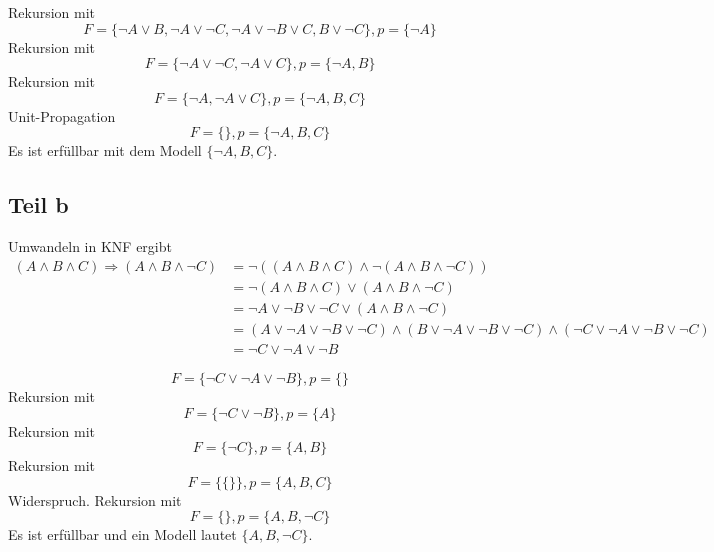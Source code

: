\documentclass[10pt,a4paper]{article}
\begin{document}
Rekursion mit
\begin{equation}
  F = \{ \neg A \lor B, \neg A \lor \neg C, \neg A \lor \neg B \lor C, B \lor \neg C \}, p = \{ \neg A \}
\end{equation}
Rekursion mit
\begin{equation}
  F = \{ \neg A \lor \neg C, \neg A \lor C \}, p = \{ \neg A, B \}
\end{equation}
Rekursion mit
\begin{equation}
  F = \{ \neg A, \neg A \lor C \}, p = \{ \neg A, B, C \}
\end{equation}
Unit-Propagation
\begin{equation}
  F = \{ \}, p = \{ \neg A, B, C \}
\end{equation}
Es ist erfüllbar mit dem Modell $\{ \neg A, B, C \}$.

\subsection{Teil b}

Umwandeln in KNF ergibt
\begin{align*}
  (A \land B \land C) \Rightarrow (A \land B \land \neg C) & = \neg((A \land B \land C) \land \neg(A \land B \land \neg C))\\
  & = \neg(A \land B \land C) \lor (A \land B \land \neg C)\\
  & = \neg A \lor \neg B \lor \neg C \lor (A \land B \land \neg C)\\
  & = (A \lor \neg A \lor \neg B \lor \neg C) \land (B \lor \neg A \lor \neg B \lor \neg C) \land (\neg C \lor \neg A \lor \neg B \lor \neg C)\\
  & = \neg C \lor \neg A \lor \neg B
\end{align*}

\begin{equation}
  F = \{ \neg C \lor \neg A \lor \neg B \}, p = \{  \}
\end{equation}
Rekursion mit
\begin{equation}
  F = \{ \neg C \lor \neg B \}, p = \{ A \}
\end{equation}
Rekursion mit
\begin{equation}
  F = \{ \neg C \}, p = \{ A, B \}
\end{equation}
Rekursion mit
\begin{equation}
  F = \{ \{  \} \}, p = \{ A, B, C \}
\end{equation}
Widerspruch.
Rekursion mit
\begin{equation}
  F = \{ \}, p = \{ A, B, \neg C \}
\end{equation}
Es ist erfüllbar und ein Modell lautet $\{ A, B, \neg C \}$.
\end{document}

